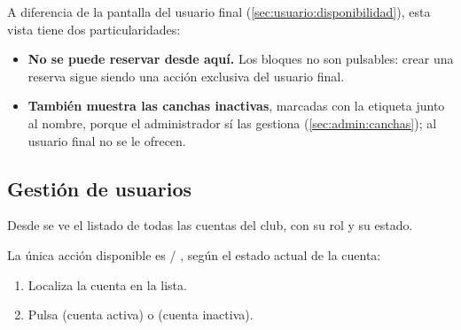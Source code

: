 
A diferencia de la pantalla del usuario final (\cref{sec:usuario:disponibilidad}),
esta vista tiene dos particularidades:

\begin{itemize}
  \item \textbf{No se puede reservar desde aquí.} Los bloques no son
        pulsables: crear una reserva sigue siendo una acción exclusiva del
        usuario final.
  \item \textbf{También muestra las canchas inactivas}, marcadas con la
        etiqueta  junto al nombre, porque el administrador
        sí las gestiona (\cref{sec:admin:canchas}); al usuario final no se
        le ofrecen.
\end{itemize}


\subsection{Gestión de usuarios}
\label{sec:admin:usuarios}

Desde  se ve el listado de todas las cuentas del club,
con su rol y su estado.


La única acción disponible es  / , según
el estado actual de la cuenta:

\begin{enumerate}
  \item Localiza la cuenta en la lista.
  \item Pulsa  (cuenta activa) o  (cuenta
        inactiva).
\end{enumerate}



